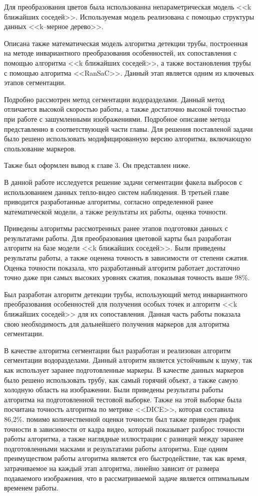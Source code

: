 \documentclass[14pt, a4paper]{extreport}
\begin{document}
	Для преобразования цветов была использованна непараметрическая модель <<k ближайших соседей>>. Используемая модель реализована с помощью структуры данных <<k--мерное дерево>>.
	
	Описана также математическая модель алгоритма детекции трубы, построенная на методе инвариантного преобразования особенностей, их сопоставления с помощью алгоритма <<k ближайших соседей>>, а также востановления трубы с помощью алгоритма <<RanSaC>>. Данный этап является одним из ключевых этапов сегментации.
	
	Подробно рассмотрен метод сегментации водоразделами. Данный метод отличается высокой скоростью работы, а также достаточно высокой точностью при работе с зашумленными изображениями. Подробное описание метода представленно в соответствующей части главы. Для решения поставленой задачи было решено использовать модифицированную версию алгоритма, включающую спользование маркеров.
	
	Также был оформлен вывод к главе 3. Он представлен ниже.
	
	В данной работе исследуется решение задачи сегментации факела выбросов с использованием данных тепло-видео систем наблюдения. В третьей главе приводится разработанные алгоритмы, согласно определенной ранее математической модели, а также результаты их работы, оценка точности.
	
	Приведены алгоритмы рассмотренных ранее этапов подготовки данных с результатами работы. Для преобразования цветовой карты был разработан алгоритм на базе модели <<k ближайших соседей>>. Были приведены результаты работы, а также оценена точность в зависимости от степени сжатия. Оценка точности показала, что разработанный алгоритм работает достаточно точно даже при самых высоких уровнях сжатия, показывая точность выше 98\%.
	
	Был разработан алгоритм детекции трубы, использующий метод инвариантного преобразования особенностей для получения особых точек и алгоритм <<k ближайших соседей>> для их сопоставления. Данная часть работы показала свою необходимость для дальнейшего получения маркеров для алгоритма сегментации.
	
	В качестве алгоритма сегментации был разработан и реализован алгоритм сегментации водоразделами. Данный алгоритм является устойчивым к шуму, так как использует заранее подготовленные маркеры. В качестве данных маркеров было решено использовать трубу, как самый горячий объект, а также самую холодную область на изображении. Были приведены результаты работы алгоритма на подготовленной тестовой выборке. Также на этой выборке была посчитана точность алгоритма по метрике <<DICE>>, которая составила 86,2\%. помимо количественной оценки точности был также приведен график точности в зависимости от кадра видео, который показывает разброс точности работы алгоритма, а также наглядные иллюстрации с разницей между заранее подготовленными масками и результатами работы алгоритма. Еще одним преимуществом работы алгоритма является его быстродействие, так как время, затрачиваемое на каждый этап алгоритма, линейно зависит от размера подаваемого изображения, что в рассматриваемой задаче является оптимальным временем работы.
	
\end{document}
